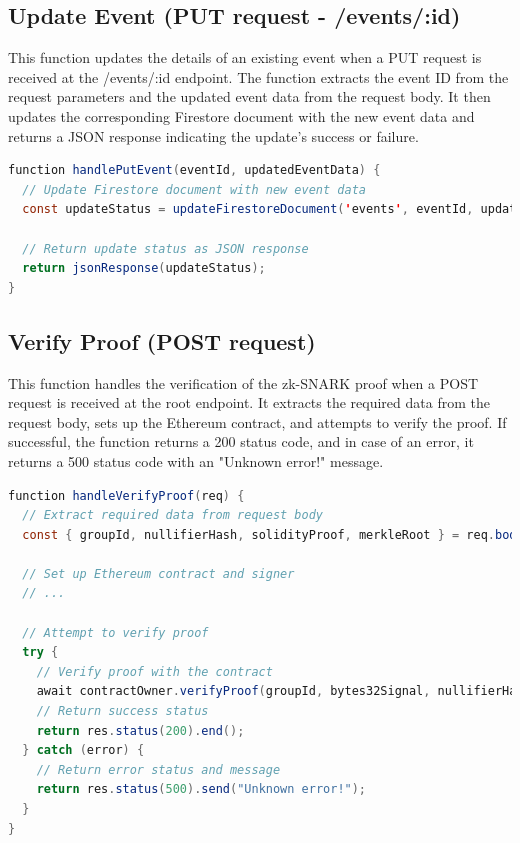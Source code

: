 \subsection{Update Event (PUT request - /events/:id)}
This function updates the details of an existing event when a PUT request is received at the /events/:id endpoint. The function extracts the event ID from the request parameters and the updated event data from the request body. It then updates the corresponding Firestore document with the new event data and returns a JSON response indicating the update's success or failure.

\begin{lstlisting}[language=Java, name={Update Event Function}, label={sc:updateEvent}]
function handlePutEvent(eventId, updatedEventData) {
  // Update Firestore document with new event data
  const updateStatus = updateFirestoreDocument('events', eventId, updatedEventData);

  // Return update status as JSON response
  return jsonResponse(updateStatus);
}
\end{lstlisting}


\subsection{Verify Proof (POST request)}
This function handles the verification of the zk-SNARK proof when a POST request is received at the root endpoint. It extracts the required data from the request body, sets up the Ethereum contract, and attempts to verify the proof. If successful, the function returns a 200 status code, and in case of an error, it returns a 500 status code with an "Unknown error!" message.

\begin{lstlisting}[language=Java, name={Verify Proof Function}, label={sc:verifyProof}]
function handleVerifyProof(req) {
  // Extract required data from request body
  const { groupId, nullifierHash, solidityProof, merkleRoot } = req.body;

  // Set up Ethereum contract and signer
  // ...

  // Attempt to verify proof
  try {
    // Verify proof with the contract
    await contractOwner.verifyProof(groupId, bytes32Signal, nullifierHash, merkleRoot, solidityProof);
    // Return success status
    return res.status(200).end();
  } catch (error) {
    // Return error status and message
    return res.status(500).send("Unknown error!");
  }
}
\end{lstlisting}


